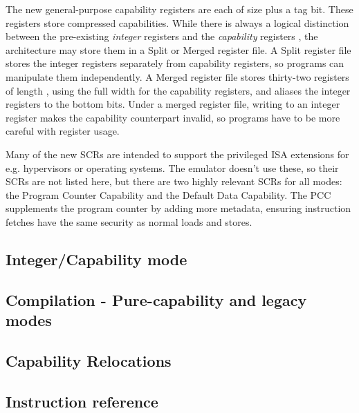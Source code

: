 The new general-purpose capability registers are each of size  plus a tag bit.
These registers store compressed capabilities.
While there is always a logical distinction between the pre-existing \emph{integer} registers  and the \emph{capability} registers , the architecture may store them in a Split or Merged register file.
A Split register file stores the integer registers separately from capability registers, so programs can manipulate them independently.
A Merged register file stores thirty-two registers of length , using the full width for the capability registers, and aliases the integer registers to the bottom  bits.
Under a merged register file, writing to an integer register makes the capability counterpart invalid, so programs have to be more careful with register usage.



Many of the new SCRs are intended to support the privileged ISA extensions for e.g. hypervisors or operating systems.
The emulator doesn't use these, so their SCRs are not listed here, but there are two highly relevant SCRs for all modes: the Program Counter Capability and the Default Data Capability.
The PCC supplements  the program counter by adding more metadata, ensuring instruction fetches have the same security as normal loads and stores.


\subsection{Integer/Capability mode}

\subsection{Compilation - Pure-capability and legacy modes}

\subsection{Capability Relocations}

\subsection{Instruction reference}
